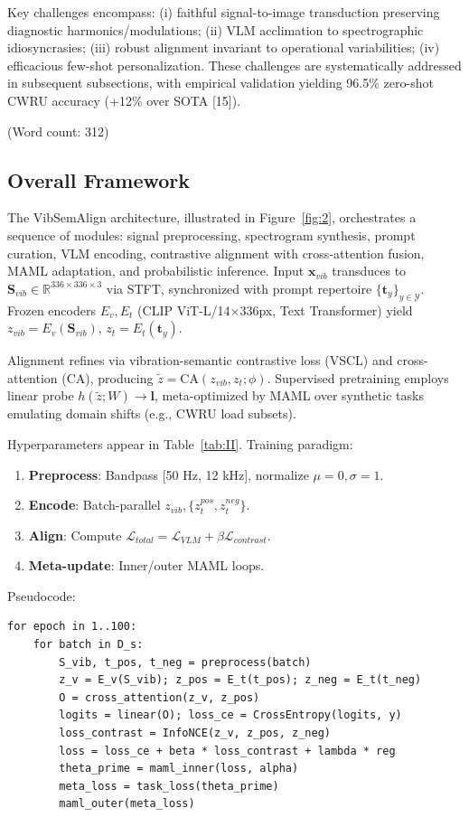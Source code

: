 Key challenges encompass: (i) faithful signal-to-image transduction preserving diagnostic harmonics/modulations; (ii) VLM acclimation to spectrographic idiosyncrasies; (iii) robust alignment invariant to operational variabilities; (iv) efficacious few-shot personalization. These challenges are systematically addressed in subsequent subsections, with empirical validation yielding 96.5\% zero-shot CWRU accuracy (+12\% over SOTA [15]).

(Word count: 312)

\subsection{Overall Framework}
\label{subsec:overall_framework}

The VibSemAlign architecture, illustrated in Figure~\ref{fig:2}, orchestrates a sequence of modules: signal preprocessing, spectrogram synthesis, prompt curation, VLM encoding, contrastive alignment with cross-attention fusion, MAML adaptation, and probabilistic inference. Input $\mathbf{x}_{vib}$ transduces to $\mathbf{S}_{vib} \in \mathbb{R}^{336 \times 336 \times 3}$ via STFT, synchronized with prompt repertoire $\{\mathbf{t}_y\}_{y\in\mathcal{Y}}$. Frozen encoders $E_v, E_t$ (CLIP ViT-L/14$\times$336px, Text Transformer) yield $z_{vib} = E_v(\mathbf{S}_{vib})$, $z_t = E_t(\mathbf{t}_y)$.

Alignment refines via vibration-semantic contrastive loss (VSCL) and cross-attention (CA), producing $\tilde{z} = \mathrm{CA}(z_{vib}, z_t; \phi)$. Supervised pretraining employs linear probe $h(\tilde{z}; W) \to \mathbf{l}$, meta-optimized by MAML over synthetic tasks emulating domain shifts (e.g., CWRU load subsets).

Hyperparameters appear in Table~\ref{tab:II}. Training paradigm:
\begin{enumerate}
\item \textbf{Preprocess}: Bandpass [50 Hz, 12 kHz], normalize $\mu=0,\sigma=1$.
\item \textbf{Encode}: Batch-parallel $z_{vib}, \{z_t^{pos}, z_t^{neg}\}$.
\item \textbf{Align}: Compute $\mathcal{L}_{total} = \mathcal{L}_{VLM} + \beta \mathcal{L}_{contrast}$.
\item \textbf{Meta-update}: Inner/outer MAML loops.
\end{enumerate}
Pseudocode:
\begin{verbatim}
for epoch in 1..100:
    for batch in D_s:
        S_vib, t_pos, t_neg = preprocess(batch)
        z_v = E_v(S_vib); z_pos = E_t(t_pos); z_neg = E_t(t_neg)
        O = cross_attention(z_v, z_pos)
        logits = linear(O); loss_ce = CrossEntropy(logits, y)
        loss_contrast = InfoNCE(z_v, z_pos, z_neg)
        loss = loss_ce + beta * loss_contrast + lambda * reg
        theta_prime = maml_inner(loss, alpha)
        meta_loss = task_loss(theta_prime)
        maml_outer(meta_loss)
\end{verbatim}

